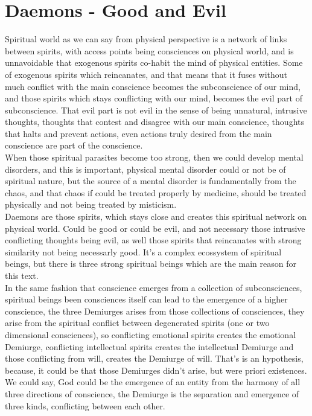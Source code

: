 \documentclass[12pt,a4paper]{article}
\begin{document}

\section{Daemons - Good and Evil}

\hspace{\baselineskip}

Spiritual world as we can say from physical perspective is a network of links between spirits, with access points being consciences on physical world, and is unnavoidable that exogenous spirits co-habit the mind of physical entities. Some of exogenous spirits which reincanates, and that means that it fuses without much conflict with the main conscience becomes the subconscience of our mind, and those spirits which stays conflicting with our mind, becomes the evil part of subconscience. That evil part is not evil in the sense of being unnatural, intrusive thoughts, thoughts that contest and disagree with our main conscience, thoughts that halts and prevent actions, even actions truly desired from the main conscience are part of the conscience.\\

When those spiritual parasites become too strong, then we could develop mental disorders, and this is important, physical mental disorder could or not be of spiritual nature, but the source of a mental disorder is fundamentally from the chaos, and that chaos if could be treated properly by medicine, should be treated physically and not being treated by misticism. \\

Daemons are those spirits, which stays close and creates this spiritual network on physical world. Could be good or could be evil, and not necessary those intrusive conflicting thoughts being evil, as well those spirits that reincanates with strong similarity not being necessarly good. It's a complex ecossystem of spiritual beings, but there is three strong spiritual beings which are the main reason for this text.\\ 

In the same fashion that conscience emerges from a collection of subconsciences, spiritual beings been consciences itself can lead to the emergence of a higher conscience, the three Demiurges arises from those collections of consciences, they arise from the spiritual conflict between degenerated spirits (one or two dimensional consciences), so conflicting emotional spirits creates the emotional Demiurge, conflicting intellectual spirits creates the intellectual Demiurge and those conflicting from will, creates the Demiurge of will. That's is an hypothesis, because, it could be that those Demiurges didn't arise, but were priori existences. We could say, God could be the emergence of an entity from the harmony of all three directions of conscience, the Demiurge is the separation and emergence of three kinds, conflicting between each other. \\
\end{document}
